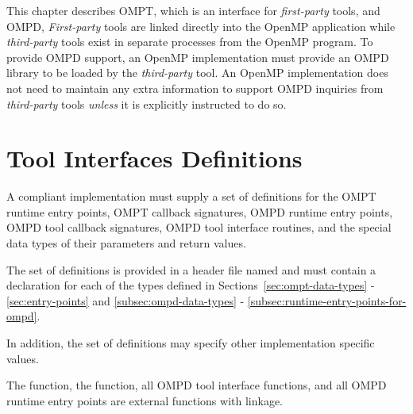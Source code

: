 This chapter describes OMPT, which is an interface for \emph{first-party} tools,
and OMPD, \emph{First-party} tools are linked directly into the OpenMP application
while \emph{third-party} tools exist in separate processes from the OpenMP program.
To provide OMPD support, an OpenMP implementation must provide an OMPD library to 
be loaded by the \emph{third-party} tool. An OpenMP implementation does not need 
to maintain any extra information to support OMPD inquiries from \emph{third-party} 
tools \emph{unless} it is explicitly instructed to do so.

\section{Tool Interfaces Definitions}
\label{sec:tool_interfaces_definitions}

\begin{ccppspecific}

A compliant implementation must supply a set of definitions for the OMPT runtime 
entry points, OMPT callback signatures, OMPD runtime entry points, OMPD tool 
callback signatures, OMPD tool interface routines, and the special data types of 
their parameters and return values.

The set of definitions is provided in a header file named  and must 
contain a declaration for each of the types defined in 
Sections~\ref{sec:ompt-data-types} - \ref{sec:entry-points} and
\ref{subsec:ompd-data-types} - \ref{subsec:runtime-entry-points-for-ompd}. 

In addition, the set of definitions may specify other implementation specific values.

The  function, the  function, all OMPD 
tool interface functions, and all OMPD runtime entry points are external functions with 
 linkage.
	
			
\end{ccppspecific}











